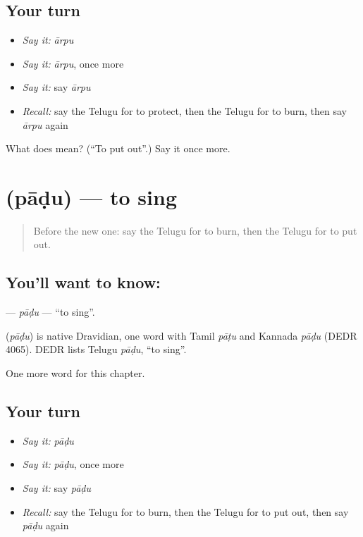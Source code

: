 \subsection*{Your turn}
\begin{itemize}
\raggedright
  \item \emph{Say it:} \emph{ārpu}
  \item \emph{Say it:} \emph{ārpu}, once more
  \item \emph{Say it:} say \emph{ārpu}
  \item \emph{Recall:} say the Telugu for to protect, then the Telugu for to burn, then say \emph{ārpu} again
\end{itemize}

\begin{tcolorbox}[breakable,colback=teal!4,colframe=teal!35!black,title={Before you move on}]
What does  mean? (\textquotedblleft{}To put out\textquotedblright{}.) Say it once more.
\end{tcolorbox}
\section[\texorpdfstring{\te{పాడు} (pāḍu)}{పాడు (pāḍu)}]{ (pāḍu) — to sing}

\label{lesson:TE-C148-padu}



\begin{quote}
Before the new one: say the Telugu for to burn, then the Telugu for to put out.
\end{quote}

\subsection*{You'll want to know: }
\textbf{} — \emph{pāḍu} — \textquotedblleft{}to sing\textquotedblright{}.

\begin{cousinweb}
\textbf{} (\emph{pāḍu}) is native Dravidian, one word with Tamil \emph{pāṭu} and Kannada \emph{pāḍu} (DEDR 4065). DEDR lists Telugu \emph{pāḍu}, \textquotedblleft{}to sing\textquotedblright{}.
\end{cousinweb}

\begin{grammarlens}[title={What you've built}]
One more word for this chapter.
\end{grammarlens}

\subsection*{Your turn}
\begin{itemize}
\raggedright
  \item \emph{Say it:} \emph{pāḍu}
  \item \emph{Say it:} \emph{pāḍu}, once more
  \item \emph{Say it:} say \emph{pāḍu}
  \item \emph{Recall:} say the Telugu for to burn, then the Telugu for to put out, then say \emph{pāḍu} again
\end{itemize}

